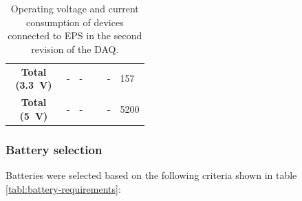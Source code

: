 \documentclass{report}
\begin{document}
\begin{table}[H]
\begin{tabular}{|c|c|p{0.2\linewidth}|c|p{0.2\linewidth}|}
    \hline
    \textbf{Total (\SI{3.3}{\volt})} & -                             & -                                              & -                 & 157                                       \\
    \textbf{Total (\SI{5}{\volt})}   & -                             & -                                              & -                 & 5200                                      \\
    \hline
  \end{tabular}
  \caption{Operating voltage and current consumption of devices connected to EPS in the second revision of the DAQ.}
  \label{tabl:eps-power-budget}
\end{table}

\subsubsection{Battery selection}

Batteries were selected based on the following criteria shown in table \ref{tabl:battery-requirements}:
\end{document}
